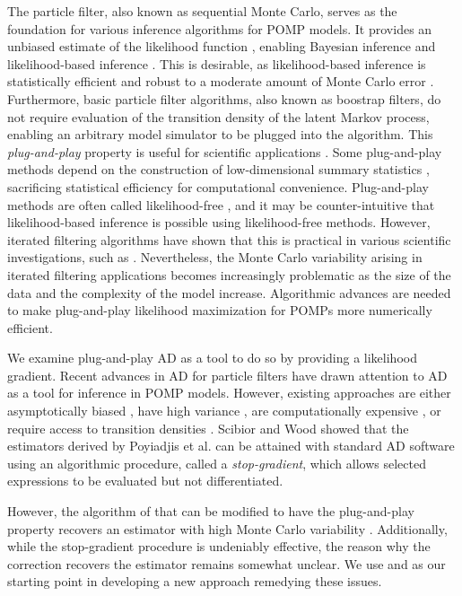 \documentclass[9pt,twocolumn,pnasresearcharticle]{pnas-new}
\begin{document}
The particle filter, also known as sequential Monte Carlo, serves as the foundation for various inference algorithms for POMP models.
It provides an unbiased estimate of the likelihood function  \cite{delMoral04}, enabling Bayesian inference \cite{andrieu10,chopin13} and likelihood-based inference \cite{ionides06-pnas,ionides15}.
This is desirable, as likelihood-based inference is statistically efficient \cite{pawitan01} and robust to a moderate amount of Monte Carlo error \cite{ionides17,ning21}.
Furthermore, basic particle filter algorithms, also known as boostrap filters, do not require evaluation of the transition density of the latent Markov process, enabling an arbitrary model simulator to be plugged into the algorithm.
This \textit{plug-and-play} property is useful for scientific applications \cite{he10}.
Some plug-and-play methods depend on the construction of low-dimensional summary statistics \cite{wood10,toni09}, sacrificing statistical efficiency for computational convenience.
Plug-and-play methods are often called likelihood-free \cite{owen15}, and it may be counter-intuitive that likelihood-based inference is possible using likelihood-free methods. 
However, iterated filtering algorithms have shown that this is practical in various scientific investigations, such as \cite{king08,blake14,pons-salort18,subramanian21,fox22,drake23}.
Nevertheless, the Monte Carlo variability arising in iterated filtering applications becomes increasingly problematic as the size of the data and the complexity of the model increase.
Algorithmic advances are needed to make plug-and-play likelihood maximization for POMPs more numerically efficient.


We examine plug-and-play AD as a tool to do so by providing a likelihood gradient. Recent advances in AD for particle filters \cite{naesseth18, jonschkowski18, corenflos21, scibior21, singh22} have drawn attention to AD as a tool for inference in POMP models.
However, existing approaches are either asymptotically biased \cite{naesseth18, jonschkowski18}, have high variance \cite{poyiadjis11, scibior21}, are computationally expensive \cite{corenflos21, chen24}, or require access to transition densities \cite{poyiadjis11, scibior21, singh22, chen24}. Scibior and Wood \cite{scibior21} showed that the estimators derived by Poyiadjis et al. \cite{poyiadjis11} can be attained with standard AD software using an algorithmic procedure, called a {\it stop-gradient}, which allows selected expressions to be evaluated but not differentiated.

However, the algorithm of \cite{scibior21} that can be modified to have the plug-and-play property recovers an estimator with high Monte Carlo variability \cite{poyiadjis11}. Additionally, while the stop-gradient procedure is undeniably effective, the reason why the correction recovers the \cite{poyiadjis11} estimator remains somewhat unclear.
We use \cite{scibior21} and \cite{poyiadjis11} as our starting point in developing a new approach remedying these issues.
\end{document}
